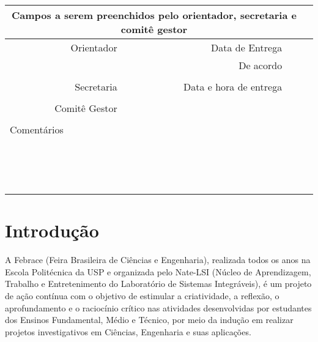 \documentclass[a4paper,12pt,font=plain,header=plain]{abnt}
\begin{document}
	    \begin{tabularx}{0.97\linewidth}{ |r|r|X|r| }

			\hline
				\multicolumn{3}{|c|}{Campos a serem preenchidos pelo orientador, secretaria e comitê gestor} \\
			\hline
				Orientador & Data de Entrega &  \\
			\hline
				& De acordo &  \\
			\hline
				& &  \\
			\hline
				Secretaria & Data e hora de entrega &  \\
			\hline
				&  &  \\
			\hline
				Comitê Gestor &  &  \\
			\hline
			&  &  \\
			\hline
				\multicolumn{3}{|l|}{Comentários} \\
				\multicolumn{3}{|l|}{} \\
				\multicolumn{3}{|l|}{} \\
				\multicolumn{3}{|l|}{} \\
				\multicolumn{3}{|l|}{} \\
				\multicolumn{3}{|l|}{} \\
				\multicolumn{3}{|l|}{} \\
				\multicolumn{3}{|l|}{} \\
				\multicolumn{3}{|l|}{} \\
				\multicolumn{3}{|l|}{} \\
				\multicolumn{3}{|l|}{} \\
				\multicolumn{3}{|l|}{} \\
				\multicolumn{3}{|l|}{} \\
				\multicolumn{3}{|l|}{} \\
				\multicolumn{3}{|l|}{} \\
				\multicolumn{3}{|l|}{} \\
			\hline
			\end{tabularx}

	\chapter{Introdução}

	A Febrace (Feira Brasileira de Ciências e Engenharia), realizada todos os anos na Escola Politécnica da USP e organizada pelo Nate-LSI (Núcleo de Aprendizagem, Trabalho e Entretenimento do Laboratório de Sistemas Integráveis), é um projeto de ação contínua com o objetivo de estimular a criatividade, a reflexão, o aprofundamento e o raciocínio crítico nas atividades desenvolvidas por estudantes dos Ensinos Fundamental, Médio e Técnico, por meio da indução em realizar projetos investigativos em Ciências, Engenharia e suas aplicações.
\end{document}
